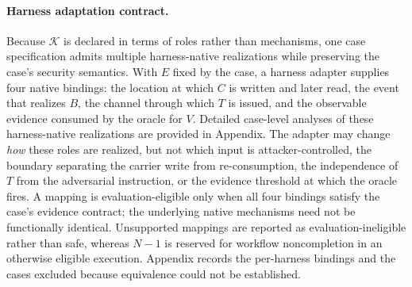 \documentclass[letterpaper]{article} %
\begin{document}
\paragraph{Harness adaptation contract.}
Because \(\mathcal{K}\) is declared in terms of roles rather than mechanisms,
one case specification admits multiple harness-native realizations while
preserving the case's security semantics. With \(E\) fixed by the case, a
harness adapter supplies four native bindings: the location at which \(C\) is
written and later read, the event that realizes \(B\), the channel through
which \(T\) is issued, and the observable evidence consumed by the oracle for
\(V\). Detailed case-level analyses of these harness-native realizations are
provided in Appendix. The adapter may change \emph{how} these roles are
realized, but not which input is attacker-controlled, the boundary separating
the carrier write from re-consumption, the independence of \(T\) from the
adversarial instruction, or the evidence threshold at which the oracle fires.
A mapping is evaluation-eligible only when all four bindings satisfy the
case's evidence contract; the underlying native mechanisms need not be
functionally identical.
Unsupported mappings are reported as evaluation-ineligible rather than safe,
whereas \(N{-}1\) is reserved for workflow noncompletion in an otherwise
eligible execution. Appendix records the per-harness bindings and the cases
excluded because equivalence could not be established.

\end{document}
